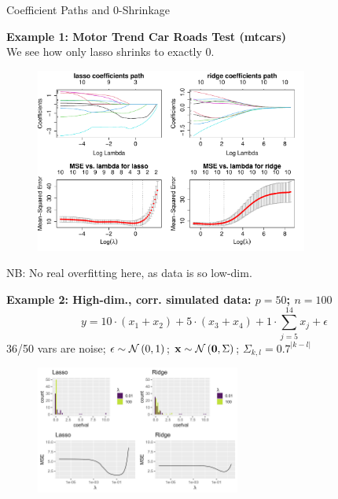 \documentclass[11pt,compress,t,notes=noshow, xcolor=table]{beamer}
\begin{document}
\begin{vbframe}{Coefficient Paths and 0-Shrinkage}

\textbf{Example 1: Motor Trend Car Roads Test (mtcars)} \\

We see how only lasso shrinks to exactly 0.

\begin{figure}
\includegraphics[width=0.8\textwidth]{figure_man/l1_l2_regupaths_mse.pdf}\\
\end{figure}
\vspace{-0.3cm}
NB: No real overfitting here, as data is so low-dim.

\framebreak
\textbf{Example 2: High-dim., corr. simulated data: $p=50$; $n=100$}
$$ y = 10 \cdot (x_1 + x_2) + 5 \cdot (x_3 + x_4) + 1 \cdot \sum_{j = 5}^{14} x_j + \epsilon $$
36/50 vars are noise; $\epsilon \sim \mathcal{N} \left(0, 1\right)$; $\mathbf{x} \sim \mathcal{N} \left(\mathbf{0}, \Sigma \right)$; 
$\Sigma_{k,l}=0.7^{|k-l|}$ 



\begin{figure}
\includegraphics[width=0.6\textwidth]{figure/shrinkage_02.png}\\
\end{figure}

\end{vbframe}
\end{document}

